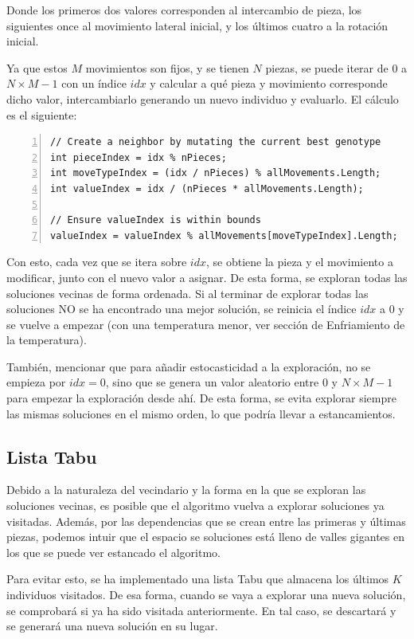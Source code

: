 \documentclass[11pt,spanish,listoffigures,listoftables]{tfgetsinf}
\begin{document}
Donde los primeros dos valores corresponden al intercambio de pieza, los siguientes once al movimiento lateral inicial, y los últimos cuatro a la rotación inicial.

Ya que estos $M$ movimientos son fijos, y se tienen $N$ piezas, se puede iterar de $0$ a $N\times M - 1$ con un índice $idx$ y calcular a qué pieza y movimiento corresponde dicho valor, intercambiarlo generando un nuevo individuo y evaluarlo. El cálculo es el siguiente:

\begin{lstlisting}[language={[Sharp]C}, basicstyle=\ttfamily\small, frame=single, numbers=left, breaklines=true]
// Create a neighbor by mutating the current best genotype
int pieceIndex = idx % nPieces;
int moveTypeIndex = (idx / nPieces) % allMovements.Length;
int valueIndex = idx / (nPieces * allMovements.Length);

// Ensure valueIndex is within bounds
valueIndex = valueIndex % allMovements[moveTypeIndex].Length;
\end{lstlisting}

Con esto, cada vez que se itera sobre $idx$, se obtiene la pieza y el movimiento a modificar, junto con el nuevo valor a asignar. De esta forma, se exploran todas las soluciones vecinas de forma ordenada. Si al terminar de explorar todas las soluciones NO se ha encontrado una mejor solución, se reinicia el índice $idx$ a $0$ y se vuelve a empezar (con una temperatura menor, ver sección de Enfriamiento de la temperatura).

También, mencionar que para añadir estocasticidad a la exploración, no se empieza por $idx = 0$, sino que se genera un valor aleatorio entre $0$ y $N \times M - 1$ para empezar la exploración desde ahí. De esta forma, se evita explorar siempre las mismas soluciones en el mismo orden, lo que podría llevar a estancamientos.

\subsection{Lista Tabu}
Debido a la naturaleza del vecindario y la forma en la que se exploran las soluciones vecinas, es posible que el algoritmo vuelva a explorar soluciones ya visitadas. Además, por las dependencias que se crean entre las primeras y últimas piezas, podemos intuir que el espacio se soluciones está lleno de valles gigantes en los que se puede ver estancado el algoritmo. 

Para evitar esto, se ha implementado una lista Tabu que almacena los últimos $K$ individuos visitados. De esa forma, cuando se vaya a explorar una nueva solución, se comprobará si ya ha sido visitada anteriormente. En tal caso, se descartará y se generará una nueva solución en su lugar.
\end{document}
